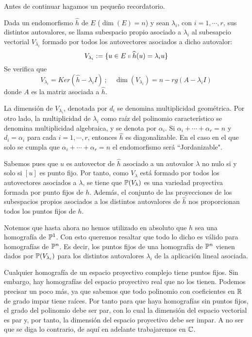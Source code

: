 Antes de continuar hagamos un pequeño recordatorio.

\begin{obs}
	Dada un endomorfismo $\widehat{h}$ de $E$ ($\dim(E)=n$) y sean $\lambda_i$, con $i=1,\cdots,r$, sus distintos autovalores, se llama subespacio propio asociado a $\lambda_i$ al subesapcio vectorial $V_{\lambda_i}$ formado por todos los autovectores asociados a dicho autovalor:
	\begin{equation}
		V_{\lambda_i}:=\{u\in E\shortparallel \widehat{h}(u)=\lambda_i u\}
	\end{equation}
	Se verifica que 
	\begin{equation}
		V_{\lambda_i}= Ker(\widehat{h}-\lambda_i I) \ ; \quad \dim(V_{\lambda_i})=n-rg(A-\lambda_i I)
	\end{equation}
	donde $A$ es la matriz asociada a $\widehat{h}$. 
	
	La dimensión de $V_{\lambda_i}$, denotada por $d_i$ se denomina multiplicidad geométrica. Por otro lado, la multiplicidad de $\lambda_i$ como raíz del polinomio característico se denomina multiplicidad algebraica, y se denota por $\alpha_i$. Si $\alpha_i+\cdots+\alpha_r=n$ y $d_i=\alpha_i$ para cada $i=1,\cdots,r$, entonces $\widehat{h}$ es diagonalizable. En el caso en el que solo se cumpla que $\alpha_i+\cdots+\alpha_r=n$ el endomorfismo será ``Jordanizable".
\end{obs}

Sabemos pues que $u$ es autovector de $\widehat{h}$ asociado a un autovalor $\lambda$ no nulo si y solo si $[u]$ es punto fijo. Por tanto, como $V_{\lambda}$ está formado por todos los autovectores asociados a $\lambda$, se tiene que $\mathbb{P}(V_\lambda)$ es una variedad proyectiva formada por punto fijos de $h$. Además, el conjunto de las proyecciones de los subespacios propios asociados a los distintos autovalores de $\widehat{h}$ nos proporcionan todos los puntos fijos de $h$.

Notemos que hasta ahora no hemos utilizado en absoluto que $h$ sea una homografía de $\mathbb{P}^1$. Con esto queremos resaltar que todo lo dicho es válido para homografías de $\mathbb{P}^n$. Es decir, los puntos fijos de una homografía de $\mathbb{P}^n$ vienen dados por $\mathbb{P}(V_{\lambda_i})$ para los distintos autovalores $\lambda_i$ de la aplicación lineal asociada.

\begin{obs}
	Cualquier homografía de un espacio proyectivo complejo tiene puntos fijos. Sin embargo, hay homografías del espacio proyectivo real que no los tienen. Podemos precisar un poco más, ya que sabemos que todo polinomio con coeficientes en $\mathbb{R}$ de grado impar tiene raíces. Por tanto para que haya homografías sin puntos fijos, el grado del polinomio debe ser par, con lo cual la dimensión del espacio vectorial es par y, por tanto, la dimensión del espacio proyectivo debe ser impar. A no ser que se diga lo contrario, de aquí en adelante trabajaremos en $\mathbb{C}$.
\end{obs}

